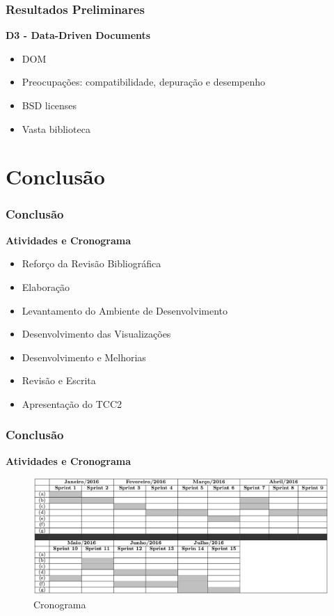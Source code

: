 \documentclass{beamer}
\begin{document}

\begin{frame}
\frametitle{Resultados Preliminares}
\textbf{D3 - Data-Driven Documents}
\begin{itemize}
\item DOM
\item Preocupações: compatibilidade, depuração e desempenho
\item BSD licenses
\item Vasta biblioteca
\end{itemize}
\end{frame}

\section{Conclusão} %

\begin{frame}
\frametitle{Conclusão}
\textbf{Atividades e Cronograma}

\begin{itemize}
\item Reforço da Revisão Bibliográfica
\item Elaboração
\item Levantamento do Ambiente de Desenvolvimento
\item Desenvolvimento das Visualizações
\item Desenvolvimento e Melhorias
\item Revisão e Escrita
\item Apresentação do TCC2
\end{itemize}

\end{frame}


\begin{frame}
\frametitle{Conclusão}
\textbf{Atividades e Cronograma}
\begin{figure}[!htb]
  \centering
    \includegraphics[keepaspectratio=true,scale=0.27]
    {../figuras/print_cronograma.eps}
  \caption{Cronograma}
  \label{fig:parallel}
\end{figure}
\end{frame}
\end{document}

